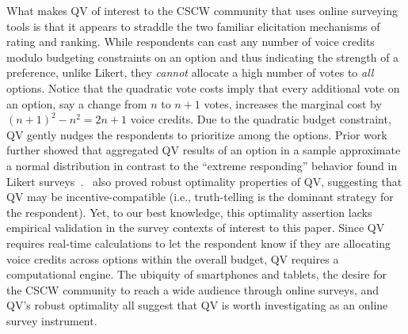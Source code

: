 What makes QV of interest to the CSCW community that uses online surveying tools is that it appears to straddle the two familiar elicitation mechanisms of rating and ranking. While respondents can cast any number of voice credits modulo budgeting constraints on an option and thus indicating the strength of a preference, unlike Likert, they \textit{cannot} allocate a high number of votes to \textit{all} options. Notice that the quadratic vote costs imply that every additional vote on an option, say a change from $n$ to $n+1$ votes, increases the marginal cost by $(n+1)^2-n^2=2n+1$ voice credits. Due to the quadratic budget constraint, QV gently nudges the respondents to prioritize among the options. Prior work further showed that aggregated QV results of an option in a sample approximate a normal distribution in contrast to  the ``extreme responding'' behavior found in Likert surveys~\cite{quarfoot2017quadratic}.~\textcite{Lalley2018} also proved robust optimality properties of QV, suggesting that QV may be incentive-compatible (i.e., truth-telling is the dominant strategy for the respondent). Yet, to our best knowledge, this optimality assertion lacks empirical validation in the survey contexts of interest to this paper. Since QV requires real-time calculations to let the respondent know if they are allocating voice credits across options within the overall budget, QV requires a computational engine. The ubiquity of smartphones and tablets, the desire for the CSCW community to reach a wide audience through online surveys, and QV's robust optimality all suggest that QV is worth investigating as an online survey instrument. 



